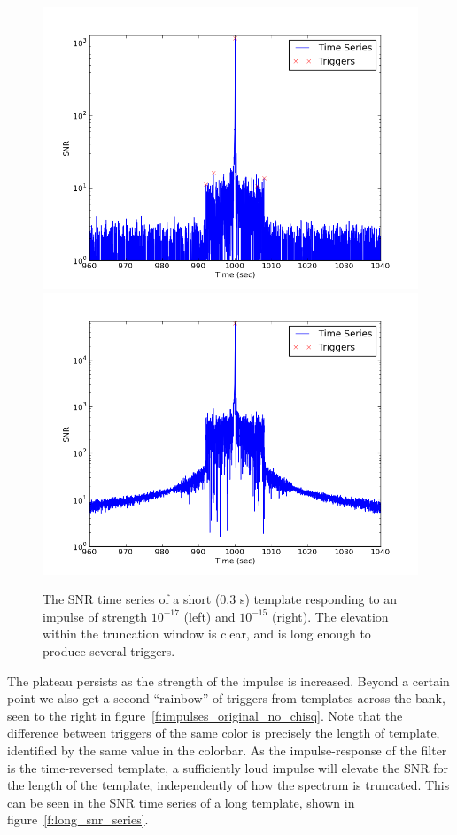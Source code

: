 \begin{figure}
  \includegraphics[width=0.5\linewidth]{figures/detchar/snrs_17_short}
  \includegraphics[width=0.5\linewidth]{figures/detchar/snrs_15_short}
  \caption[SNR time series of a short template and loud impulse] {
The SNR time series of a short (0.3 s) template responding to an
impulse of strength $10^{-17}$ (left) and $10^{-15}$ (right).  The
elevation within the truncation window is clear, and is long enough to
produce several triggers.
  \label{f:short_snr_series}
}
\end{figure}%

The plateau persists as the strength of the impulse is increased.
Beyond a certain point we also get a second ``rainbow'' of triggers
from templates across the bank, seen to the right in
figure~\ref{f:impulses_original_no_chisq}.  Note that the difference
between triggers of the same color is precisely the length of
template, identified by the same value in the colorbar.  As the
impulse-response of the filter is the time-reversed template, a
sufficiently loud impulse will elevate the SNR for the length of the
template, independently of how the spectrum is truncated.   This can
be seen in the SNR time series of a long template, shown in
figure~\ref{f:long_snr_series}.


